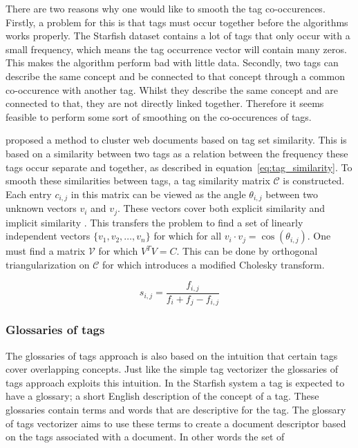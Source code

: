 There are two reasons why one would like to smooth the tag co-occurences.
Firstly, a problem for this is that tags must occur together before the
algorithms works properly. The Starfish dataset contains a lot of tags that
only occur with a small frequency, which means the tag occurrence vector will
contain many zeros. This makes the algorithm perform bad with little data.
Secondly, two tags can describe the same concept and be connected to that
concept through a common co-occurence with another tag. Whilst they describe
the same concept and are connected to that, they are not directly linked
together. Therefore it seems feasible to perform some sort of smoothing on the
co-occurences of tags.

\citet{zhou2011web} proposed a method to cluster web documents based on tag set
similarity. This is based on a similarity between two tags as a relation
between the frequency these tags occur separate and together, as described in
equation~\ref{eq:tag_similarity}. To smooth these similarities between tags, a
tag similarity matrix $\mathcal{C}$ is constructed. Each entry $c_{i,j}$ in
this matrix can be viewed as the angle $\theta_{i,j}$ between two unknown
vectors $v_i$ and $v_j$. These vectors cover both explicit similarity and
implicit similarity \citep{park2010vector}. This transfers the problem to find
a set of linearly independent vectors $\{v_1,v_2,\ldots,v_n\}$ for which for
all $v_i \cdot v_j = \cos(\theta_{i,j})$. One must find a matrix $\mathcal{V}$
for which $V^TV = C$. This can be done by orthogonal triangularization on
$\mathcal{C}$ for which \citeauthor{zhou2011web} introduces a modified Cholesky
transform.

\begin{equation} \label{eq:tag_similarity}
s_{i,j} = \frac{f_{i,j}}{f_i + f_j - f_{i,j}}
\end{equation}

\subsubsection{Glossaries of tags}
The glossaries of tags approach is also based on the intuition that certain
tags cover overlapping concepts. Just like the simple tag vectorizer the
glossaries of tags approach exploits this intuition. In the Starfish system a
tag is expected to have a glossary; a short English description of the concept
of a tag. These glossaries contain terms and words that are descriptive for the
tag. The glossary of tags vectorizer aims to use these terms to create a
document descriptor based on the tags associated with a document. In other
words the set of

